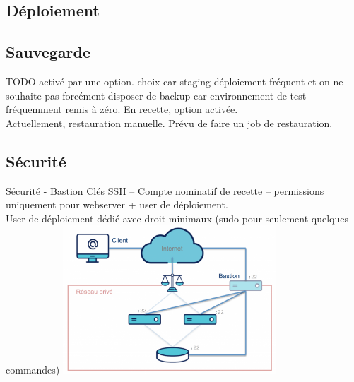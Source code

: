 \subsection{Déploiement}
\begin{frame}{\subsecname}
		
\end{frame}

\subsection{Sauvegarde}
\begin{frame}{\subsecname}
	TODO activé par une option. choix car staging déploiement fréquent et on ne souhaite pas forcément disposer de backup car environnement de test fréquemment remis à zéro. En recette, option activée. \\ 
	
	Actuellement, restauration manuelle. Prévu de faire un job de restauration.
\end{frame}

\subsection{Sécurité}
\begin{frame}{Sécurité - Bastion}
	Clés SSH  -- Compte nominatif de recette -- permissions uniquement pour webserver + user de déploiement. \\
	User de déploiement dédié avec droit minimaux (sudo pour seulement quelques commandes)
	\centering \includegraphics[width=0.60\textwidth]{img/bastion.png}
\end{frame}
